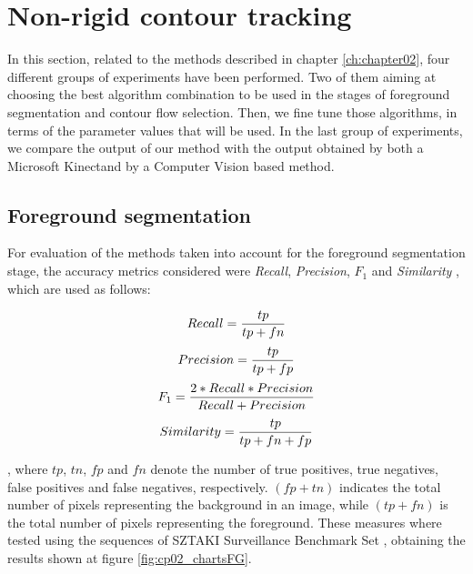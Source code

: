 \FloatBarrier
 
\graphicspath{{./images/chapter02/bmps/}{./images/chapter02/vects/}{./images/chapter02/}}
\section{Non-rigid contour tracking}\label{ch:chapter02_02}

In this section, related to the methods described in chapter \ref{ch:chapter02}, four different groups of experiments have been performed. Two of them aiming at choosing the best algorithm combination to be used in the stages of foreground segmentation and contour flow selection. Then, we fine tune those algorithms, in terms of the parameter values that will be used. In the last group of experiments, we compare the output of our method with the output obtained by both a Microsoft Kinect\textregistered and by a Computer Vision based method.

\subsection{Foreground segmentation}\label{ch:chapter02_02_01}

For evaluation of the methods taken into account for the foreground segmentation stage, the accuracy metrics considered were \textit{Recall}, \textit{Precision}, \textit{$F_1$} and \textit{Similarity} \citep{maddalena2008self}, which are used as follows:

\begin{equation}\label{eq_Recall}
Recall = { tp \over { tp + fn } }
\end{equation}
\begin{equation}\label{eq_Precision}
Precision = { tp \over { tp + fp } }
\end{equation}
\begin{equation}\label{eq_F1}
F_1 = { {2 * Recall * Precision} \over {Recall + Precision} }
\end{equation}
\begin{equation}\label{eq_Similarity}
Similarity = { tp \over { tp + fn + fp } }
\end{equation}

, where $tp$, $tn$, $fp$ and $fn$ denote the number of true positives, true negatives, false positives and false negatives, respectively. $(fp + tn)$ indicates the total number of pixels representing the background in an image, while $(tp + fn)$ is the total number of pixels representing the foreground.
These measures where tested using the sequences of SZTAKI Surveillance Benchmark Set \citep{benedek2008bayesian}, obtaining the results shown at figure \ref{fig:cp02_chartsFG}.

